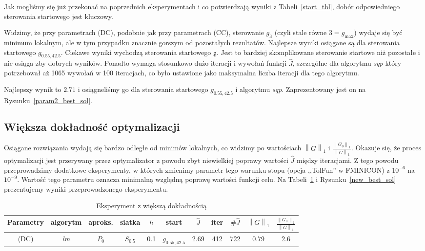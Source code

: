 \documentclass[11pt]{article}
\newcommand{\norm}[1]{\left\lVert#1\right\rVert}
\begin{document}
Jak mogliśmy się już przekonać na poprzednich eksperymentach i co potwierdzają wyniki z Tabeli~\ref{start_tbl}, dobór odpowiedniego sterowania startowego jest kluczowy.

Widzimy, że przy parametrach (DC), podobnie jak przy parametrach (CC), sterowanie $g_3$ (czyli stale równe $3 = g_{\max}$) wydaje się być minimum lokalnym, ale w tym przypadku znacznie gorszym od pozostałych rezultatów. Najlepsze wyniki osiągane są dla sterowania startowego $g_{0.55,42.5}$. Ciekawe wyniki wychodzą sterowania startowego $\mathfrak{g}$. Jest to bardziej skomplikowane sterowanie startowe niż pozostałe i nie osiąga zby dobrych wyników. Ponadto wymaga stosunkowo dużo iteracji i wywołań funkcji $\hat{J}$, szczególne dla algorytmu {\it sqp\/} który potrzebował aż 1065 wywołań w 100 iteracjach, co było ustawione jako maksymalna liczba iteracji dla tego algorytmu.

Najlepszy wynik to $2.71$ i osiągneliśmy go dla sterowania startowego $g_{0.55,42.5}$ i algorytmu {\it sqp}. Zaprezentowany jest on na Rysunku~\ref{param2_best_sol}.

\subsection{Większa dokładność optymalizacji}
Osiągane rozwiązania wydają się bardzo odległe od minimów lokalnych, co widzimy po wartościach $\norm{G}_1$ i $\frac{\norm{G_0}_1}{\norm{G}_1}$. Okazuje się, że proces optymalizacji jest przerywany przez optymalizator z powodu zbyt niewielkiej poprawy wartości $\hat{J}$ między iteracjami. Z tego powodu przeprowadzimy dodatkowe eksperymenty, w których zmienimy parametr tego warunku stopu (opcja ,,TolFun'' w FMINICON) z $10^{-6}$ na $10^{-9}$. Wartość tego parametru oznacza minimalną względną poprawę wartości funkcji celu. Na Tabeli~\ref{new_best_tbl} i Rysunku~\ref{new_best_sol} prezentujemy wyniki przeprowadzonego eksperymentu.

\begin{table}[h!]
  \begin{center}
    \begin{tabular}{|c|c|c|c|c|c|c|c|c|c|c|}
      \hline
      Parametry & algorytm & aproks. & siatka & $h$ & start & $\hat{J}$ & iter & $\#\hat{J}$ & $\norm{G}_1$ & $\frac{\norm{G_0}_1}{\norm{G}_1}$ \\
      \hline
      (DC) & {\it lm\/} & $P_0$ & $S_{0.5}$ & 0.1 & $g_{0.55,42.5}$ & 2.69 & 412 & 722 & 0.79 & 2.6 \\
      \hline
    \end{tabular}
    \caption{Eksperyment z większą dokładnością}\label{new_best_tbl}
  \end{center}
\end{table}
\end{document}
